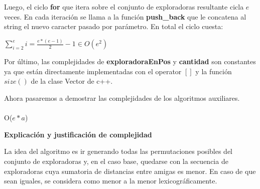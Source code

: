 \documentclass[11pt]{article}
\begin{document}
Luego, el ciclo \textbf{for} que itera sobre el conjunto de exploradoras resultante cicla $e$ veces. En cada
iteración se llama a la función \textbf{push\_back} que le concatena al string el nuevo caracter pasado por parámetro.
En total el ciclo cuesta:

\begin{center}
$\sum\limits_{i=2}^e i = \frac{e*(e-1)}{2} - 1 \in O(e^2)$
\end{center}

Por último, las complejidades de \textbf{exploradoraEnPos} y \textbf{cantidad} son constantes ya que están
directamente implementadas con el operator $[]$ y la función $size()$ de la clase Vector de c++.

Ahora pasaremos a demostrar las complejidades de los algoritmos auxiliares.
\\ \\
\noindent\makebox[\linewidth]{\rule{17cm}{0.4pt}}
 {O($e*a$)}

\vspace{3mm}
\begin{center}
\textbf{Explicación y justificación de complejidad} \\ 
\end{center} 

La idea del algoritmo es ir generando todas las permutaciones posibles del conjunto de exploradoras y, en el 
caso base, quedarse con la secuencia de exploradoras cuya sumatoria de distancias entre 
amigas es menor. En caso de que sean iguales, se considera como menor a la menor lexicográficamente. 
\end{document}
